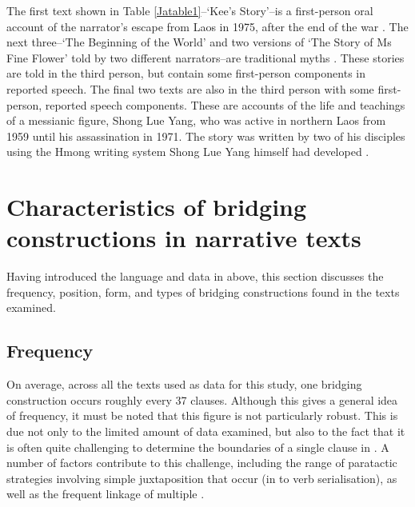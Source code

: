 \documentclass[output=paper]{LSP/langsci}
\begin{document}
The first text shown in Table \ref{Jatable1}--`Kee’s Story'--is a first-person oral account of the narrator’s escape from Laos in 1975, after the end of the war \citep[][225--235]{fuller85}. The next three--`The Beginning of the World' and two versions of `The Story of Ms Fine Flower' told by two different narrators--are traditional  myths \citep[][3--13, 120--140, 161--168]{johnson92}. These stories are told in the third person, but contain some first-person components in reported speech. The final two texts are also in the third person with some first-person, reported speech components. These are accounts of the life and teachings of a messianic figure, Shong Lue Yang, who was active in northern Laos from 1959 until his assassination in 1971. The story was written by two of his disciples using the Hmong writing system Shong Lue Yang himself had developed \citep[][11--37]{vang90}.

%
\section{Characteristics of bridging constructions in narrative texts} 
\label{Jasec:Characteristics}

Having introduced the language and data in  above, this section discusses the frequency, position, form, and types of bridging constructions found in the texts examined.
%
\subsection{Frequency}
\label{JaFrequency}
On average, across all the texts used as data for this study, one bridging construction occurs roughly every 37 clauses. Although this gives a general idea of frequency, it must be noted that this figure is not particularly robust. This is due not only to the limited amount of data examined, but also to the fact that it is often quite challenging to determine the boundaries of a single clause in . A number of factors contribute to this challenge, including the range of paratactic strategies involving simple juxtaposition that occur (in  to verb serialisation), as well as the frequent linkage of multiple  \citep[][183--186, 237--241]{jarkey15}.
\end{document}
